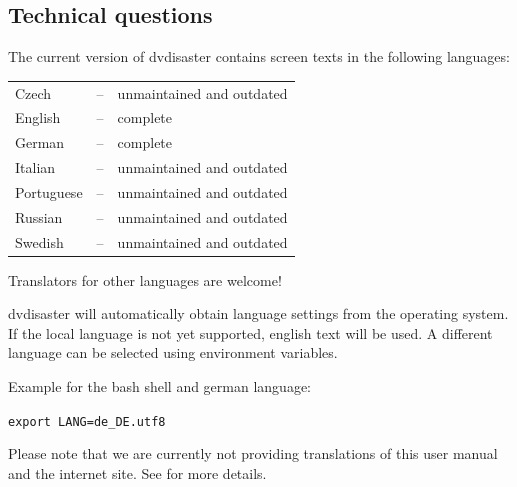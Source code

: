 \newpage
\subsection{Technical questions}
\label{qa-technical}
\setcounter{qaitem}{0}

{The current version of dvdisaster contains screen texts in the following languages:

\medskip
  
\begin{tabular}{lll}
Czech &--& unmaintained and outdated\\
English &--& complete\\
German &--& complete\\
Italian &--& unmaintained and outdated\\
Portuguese &--& unmaintained and outdated\\
Russian &--& unmaintained and outdated\\
Swedish &--& unmaintained and outdated\\
\end{tabular}

\medskip
  
Translators for other languages are welcome!

\bigskip

dvdisaster will automatically obtain language settings from the operating system.
If the local language is not yet supported, english text will be used. A different
language can be selected using environment variables.

\medskip

Example for the bash shell and german language:

\smallskip

{\tt export LANG=de\_DE.utf8}

\medskip

Please note that we are currently not providing translations of this user manual
and the internet site. See  for more details. 
}


